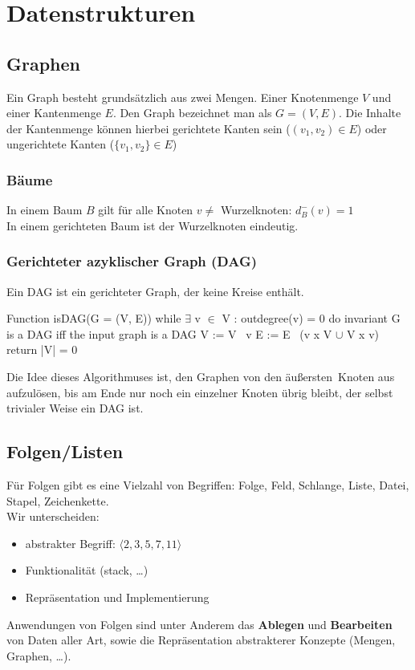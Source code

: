 \section{Datenstrukturen}
\subsection{Graphen}
Ein Graph besteht grundsätzlich aus zwei Mengen. Einer Knotenmenge $V$ und einer Kantenmenge $E$. Den Graph bezeichnet man als $G = (V, E)$. Die Inhalte der Kantenmenge können hierbei gerichtete Kanten sein ($(v_1,v_2) \in E$) oder ungerichtete Kanten ($\{v_1,v_2\}\in E$)
\subsubsection{Bäume}
In einem Baum $B$ gilt für alle Knoten $v \neq$ Wurzelknoten: $d^-_B(v) = 1$\\
In einem gerichteten Baum ist der Wurzelknoten eindeutig.

\subsubsection{Gerichteter azyklischer Graph (DAG)}
Ein DAG ist ein gerichteter Graph, der keine Kreise enthält.
\begin{PseudoCode}[caption=DAG-Bestimmung]
Function isDAG(G = (V, E))
    while $\exists$ v $\in$ V : outdegree(v) = 0 do
        invariant G is a DAG iff the input graph is a DAG
        V := V \ {v}
        E := E \ ({v} x V $\cup$ V x {v})
    return |V| = 0
\end{PseudoCode}
Die Idee dieses Algorithmuses ist, den Graphen von den \glqq äußersten\grqq\ Knoten aus aufzulösen, bis am Ende nur noch ein einzelner Knoten übrig bleibt, der selbst trivialer Weise ein DAG ist. 

\subsection{Folgen/Listen}
Für Folgen gibt es eine Vielzahl von Begriffen: Folge, Feld, Schlange, Liste, Datei, Stapel, Zeichenkette.\\
Wir unterscheiden:
\begin{itemize}
    \item abstrakter Begriff: $\langle 2,3,5,7,11 \rangle$
    \item Funktionalität (stack, \dots)
    \item Repräsentation und Implementierung
\end{itemize}
Anwendungen von Folgen sind unter Anderem das \textbf{Ablegen} und \textbf{Bearbeiten} von Daten aller Art, sowie die Repräsentation abstrakterer Konzepte (Mengen, Graphen, \dots).

